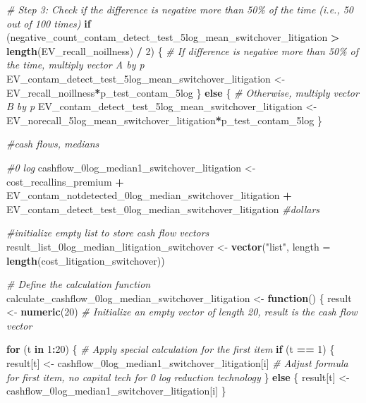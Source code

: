 \documentclass[
]{article}
\newenvironment{Shaded}{\begin{snugshade}}{\end{snugshade}}
\newcommand{\AttributeTok}[1]{\textcolor[rgb]{0.13,0.29,0.53}{#1}}
\newcommand{\CommentTok}[1]{\textcolor[rgb]{0.56,0.35,0.01}{\textit{#1}}}
\newcommand{\ControlFlowTok}[1]{\textcolor[rgb]{0.13,0.29,0.53}{\textbf{#1}}}
\newcommand{\DecValTok}[1]{\textcolor[rgb]{0.00,0.00,0.81}{#1}}
\newcommand{\FunctionTok}[1]{\textcolor[rgb]{0.13,0.29,0.53}{\textbf{#1}}}
\newcommand{\NormalTok}[1]{#1}
\newcommand{\OtherTok}[1]{\textcolor[rgb]{0.56,0.35,0.01}{#1}}
\newcommand{\SpecialCharTok}[1]{\textcolor[rgb]{0.81,0.36,0.00}{\textbf{#1}}}
\newcommand{\StringTok}[1]{\textcolor[rgb]{0.31,0.60,0.02}{#1}}
\begin{document}
\begin{Shaded}
\begin{Highlighting}[]
\CommentTok{\# Step 3: Check if the difference is negative more than 50\% of the time (i.e., 50 out of 100 times)}
\ControlFlowTok{if}\NormalTok{ (negative\_count\_contam\_detect\_test\_5log\_mean\_switchover\_litigation }\SpecialCharTok{\textgreater{}} \FunctionTok{length}\NormalTok{(EV\_recall\_noillness) }\SpecialCharTok{/} \DecValTok{2}\NormalTok{) \{}
  \CommentTok{\# If difference is negative more than 50\% of the time, multiply vector A by p}
\NormalTok{  EV\_contam\_detect\_test\_5log\_mean\_switchover\_litigation }\OtherTok{\textless{}{-}}\NormalTok{ EV\_recall\_noillness}\SpecialCharTok{*}\NormalTok{p\_test\_contam\_5log}
\NormalTok{\} }\ControlFlowTok{else}\NormalTok{ \{}
  \CommentTok{\# Otherwise, multiply vector B by p}
\NormalTok{ EV\_contam\_detect\_test\_5log\_mean\_switchover\_litigation  }\OtherTok{\textless{}{-}}\NormalTok{ EV\_norecall\_5log\_mean\_switchover\_litigation}\SpecialCharTok{*}\NormalTok{p\_test\_contam\_5log}
\NormalTok{\}}

\CommentTok{\#cash flows, medians}

\CommentTok{\#0 log}
\NormalTok{cashflow\_0log\_median1\_switchover\_litigation }\OtherTok{\textless{}{-}}\NormalTok{ cost\_recallins\_premium }\SpecialCharTok{+}\NormalTok{ EV\_contam\_notdetected\_0log\_median\_switchover\_litigation }\SpecialCharTok{+}\NormalTok{ EV\_contam\_detect\_test\_0log\_median\_switchover\_litigation }\CommentTok{\#dollars}


\CommentTok{\#initialize empty list to store cash flow vectors}
\NormalTok{result\_list\_0log\_median\_litigation\_switchover }\OtherTok{\textless{}{-}} \FunctionTok{vector}\NormalTok{(}\StringTok{"list"}\NormalTok{, }\AttributeTok{length =} \FunctionTok{length}\NormalTok{(cost\_litigation\_switchover))}


\CommentTok{\# Define the calculation function}
\NormalTok{calculate\_cashflow\_0log\_median\_switchover\_litigation }\OtherTok{\textless{}{-}} \ControlFlowTok{function}\NormalTok{() \{}
\NormalTok{  result }\OtherTok{\textless{}{-}} \FunctionTok{numeric}\NormalTok{(}\DecValTok{20}\NormalTok{)  }\CommentTok{\# Initialize an empty vector of length 20, result is the cash flow vector}
  
  \ControlFlowTok{for}\NormalTok{ (t }\ControlFlowTok{in} \DecValTok{1}\SpecialCharTok{:}\DecValTok{20}\NormalTok{) \{}
    \CommentTok{\# Apply special calculation for the first item}
    \ControlFlowTok{if}\NormalTok{ (t }\SpecialCharTok{==} \DecValTok{1}\NormalTok{) \{}
\NormalTok{      result[t] }\OtherTok{\textless{}{-}}\NormalTok{ cashflow\_0log\_median1\_switchover\_litigation[i] }\CommentTok{\# Adjust formula for first item, no capital tech for 0 log reduction technology}
\NormalTok{    \} }\ControlFlowTok{else}\NormalTok{ \{}
\NormalTok{      result[t] }\OtherTok{\textless{}{-}}\NormalTok{ cashflow\_0log\_median1\_switchover\_litigation[i]}
\NormalTok{    \}}
    

\end{Highlighting}
\end{Shaded}
\end{document}
